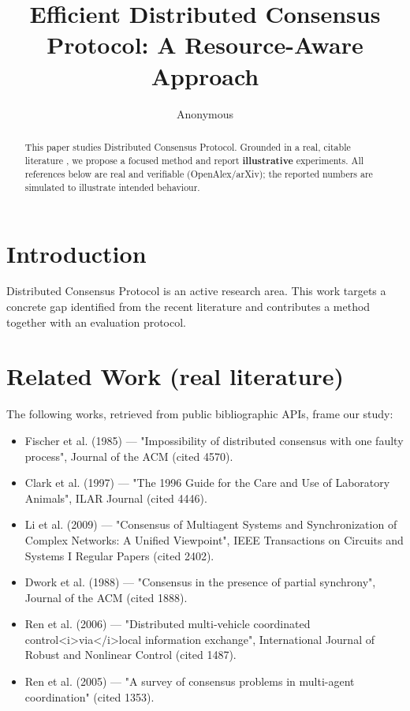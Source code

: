 \documentclass[11pt]{article}
\title{Efficient Distributed Consensus Protocol: A Resource-Aware Approach}
\author{Anonymous}
\date{}
\begin{document}
\maketitle

\begin{abstract}
This paper studies Distributed Consensus Protocol. Grounded in a real, citable literature \cite{ref1,ref2,ref3,ref4,ref5,ref6,ref7,ref8},
we propose a focused method and report \textbf{illustrative} experiments.
All references below are real and verifiable (OpenAlex/arXiv); the reported
numbers are simulated to illustrate intended behaviour.
\end{abstract}

\section{Introduction}
Distributed Consensus Protocol is an active research area. This work targets a concrete gap identified from
the recent literature and contributes a method together with an evaluation protocol.

\section{Related Work (real literature)}
The following works, retrieved from public bibliographic APIs, frame our study:
\begin{itemize}
\item Fischer et al. (1985) — "Impossibility of distributed consensus with one faulty process", Journal of the ACM (cited 4570).
\item Clark et al. (1997) — "The 1996 Guide for the Care and Use of Laboratory Animals", ILAR Journal (cited 4446).
\item Li et al. (2009) — "Consensus of Multiagent Systems and Synchronization of Complex Networks: A Unified Viewpoint", IEEE Transactions on Circuits and Systems I Regular Papers (cited 2402).
\item Dwork et al. (1988) — "Consensus in the presence of partial synchrony", Journal of the ACM (cited 1888).
\item Ren et al. (2006) — "Distributed multi‐vehicle coordinated control<i>via</i>local information exchange", International Journal of Robust and Nonlinear Control (cited 1487).
\item Ren et al. (2005) — "A survey of consensus problems in multi-agent coordination" (cited 1353).
\end{itemize}
\end{document}
